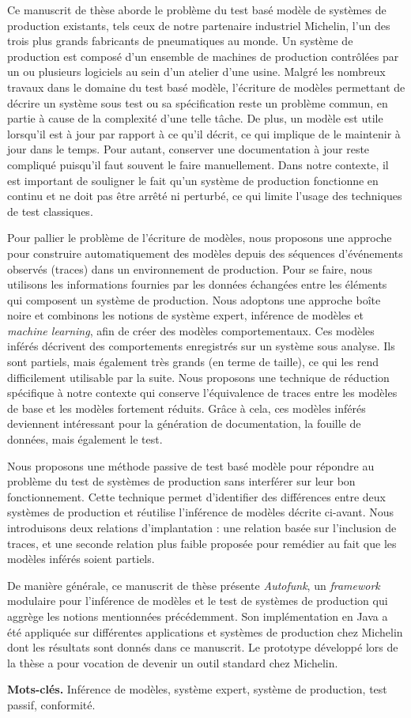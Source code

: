Ce manuscrit de thèse aborde le problème du test basé modèle de
systèmes de production existants, tels ceux de notre partenaire
industriel Michelin, l'un des trois plus grands fabricants de
pneumatiques au monde. Un système de production est composé d'un
ensemble de machines de production contrôlées par un ou plusieurs
logiciels au sein d'un atelier d'une usine. Malgré les nombreux
travaux dans le domaine du test basé modèle, l'écriture de
modèles permettant de décrire un système sous test ou sa
spécification reste un problème commun, en partie à cause de la
complexité d'une telle tâche. De plus, un modèle est utile
lorsqu'il est à jour par rapport à ce qu'il décrit, ce qui
implique de le maintenir à jour dans le temps. Pour autant,
conserver une documentation à jour reste compliqué puisqu'il faut
souvent le faire manuellement. Dans notre contexte, il est
important de souligner le fait qu'un système de production
fonctionne en continu et ne doit pas être arrêté ni perturbé, ce
qui limite l'usage des techniques de test classiques.

Pour pallier le problème de l'écriture de modèles, nous proposons
une approche pour construire automatiquement des modèles depuis
des séquences d'événements observés (traces) dans un
environnement de production. Pour se faire, nous utilisons les
informations fournies par les données échangées entre les
éléments qui composent un système de production. Nous adoptons
une approche boîte noire et combinons les notions de système
expert, inférence de modèles et \emph{machine learning}, afin de
créer des modèles comportementaux. Ces modèles inférés décrivent
des comportements enregistrés sur un système sous analyse. Ils
sont partiels, mais également très grands (en terme de taille),
ce qui les rend difficilement utilisable par la suite. Nous
proposons une technique de réduction spécifique à notre contexte
qui conserve l'équivalence de traces entre les modèles de base et
les modèles fortement réduits. Grâce à cela, ces modèles inférés
deviennent intéressant pour la génération de documentation, la
fouille de données, mais également le test.

Nous proposons une méthode passive de test basé modèle pour
répondre au problème du test de systèmes de production sans
interférer sur leur bon fonctionnement. Cette technique permet
d'identifier des différences entre deux systèmes de production et
réutilise l'inférence de modèles décrite ci-avant. Nous
introduisons deux relations d'implantation : une relation basée
sur l'inclusion de traces, et une seconde relation plus faible
proposée pour remédier au fait que les modèles inférés soient
partiels.

De manière générale, ce manuscrit de thèse présente
\emph{Autofunk}, un \emph{framework} modulaire pour l'inférence
de modèles et le test de systèmes de production qui aggrège les
notions mentionnées précédemment. Son implémentation en Java a
été appliquée sur différentes applications et systèmes de
production chez Michelin dont les résultats sont donnés dans ce
manuscrit. Le prototype développé lors de la thèse a pour
vocation de devenir un outil standard chez Michelin.

\textbf{Mots-clés.} Inférence de modèles, système expert, système
de production, test passif, conformité.
